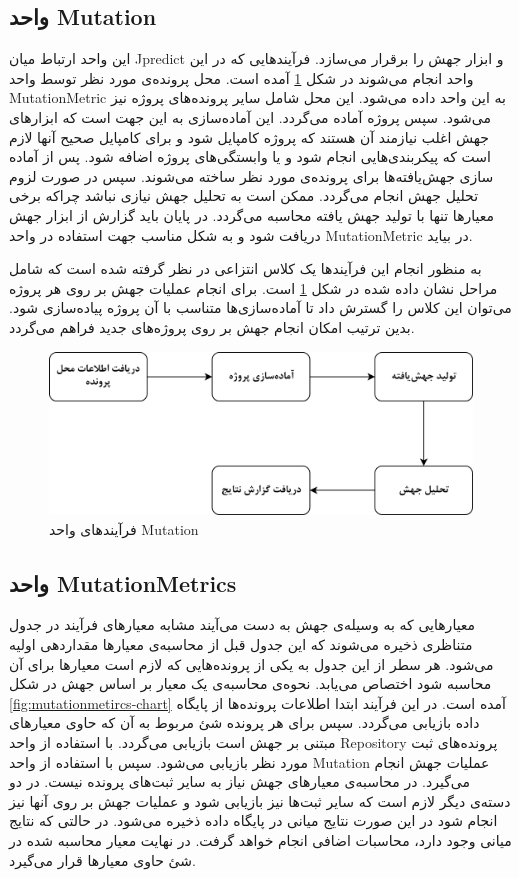\subsection{واحد Mutation}
این واحد ارتباط میان Jpredict و ابزار جهش را برقرار می‌سازد. فرآیندهایی که در این واحد انجام می‌شوند در شکل \ref{fig:mutation-chart} آمده است. محل پرونده‌ی مورد نظر توسط واحد MutationMetric به این واحد داده می‌شود. این محل شامل سایر پرونده‌های پروژه نیز می‌شود. سپس پروژه آماده می‌گردد. این آماده‌سازی به این جهت است که ابزارهای جهش اغلب نیازمند آن هستند که پروژه کامپایل شود و برای  کامپایل صحیح آنها لازم است که پیکربندی‌هایی انجام شود و یا وابستگی‌های پروژه اضافه شود. پس از آماده سازی جهش‌یافته‌ها برای پرونده‌ی مورد نظر ساخته می‌شوند. سپس در صورت لزوم تحلیل جهش انجام می‌گردد. ممکن است به تحلیل جهش نیازی نباشد چراکه برخی معیارها تنها با تولید جهش یافته محاسبه می‌گردد. در پایان باید گزارش از ابزار جهش دریافت شود و به شکل مناسب جهت استفاده در واحد MutationMetric در بیاید. 

به منظور انجام این فرآیندها یک کلاس انتزاعی در نظر گرفته شده است که شامل مراحل نشان داده شده در شکل \ref{fig:mutation-chart}  است. برای انجام عملیات جهش بر روی هر پروژه می‌توان این کلاس را گسترش داد تا آماده‌سازی‌ها متناسب با آن پروژه پیاده‌سازی شود. بدین ترتیب امکان انجام جهش بر روی پروژه‌های جدید فراهم می‌گردد.

\begin{figure}[H]
	\centering
	\includegraphics[width=.8\textwidth]{img/method/mutation-chart.png}
	\caption{ فرآیند‌های واحد Mutation}
	\label{fig:mutation-chart}
\end{figure}

\subsection{واحد MutationMetrics}

معیارهایی که به وسیله‌ی جهش به دست می‌آیند مشابه معیارهای فرآیند در جدول متناظری ذخیره می‌شوند که  این جدول قبل از محاسبه‌ی معیارها مقداردهی اولیه می‌شود. هر سطر از این جدول به یکی از پرونده‌هایی که لازم است معیارها برای آن محاسبه شود اختصاص می‌یابد.  نحوه‌ی محاسبه‌ی یک معیار بر اساس جهش در شکل \ref{fig:mutationmetircs-chart} آمده است. در این فرآیند ابتدا اطلاعات پرونده‌ها از پایگاه داده بازیابی می‌گردد. سپس برای هر پرونده شئ مربوط به آن که حاوی معیارهای  مبتنی  بر جهش است بازیابی می‌گردد. با استفاده از واحد Repository‌ پرونده‌های ثبت مورد نظر بازیابی می‌شود. سپس با استفاده از واحد Mutation عملیات جهش انجام می‌گیرد. در محاسبه‌ی معیارهای جهش نیاز به سایر ثبت‌های پرونده نیست. در دو دسته‌ی دیگر لازم است که سایر ثبت‌ها نیز بازیابی شود و عملیات جهش بر روی آنها نیز انجام شود در این صورت نتایج میانی در پایگاه داده ذخیره می‌شود.  در حالتی که نتایج میانی وجود دارد، محاسبات اضافی انجام خواهد گرفت.  در نهایت معیار محاسبه شده در شئ حاوی معیارها قرار می‌گیرد. 

